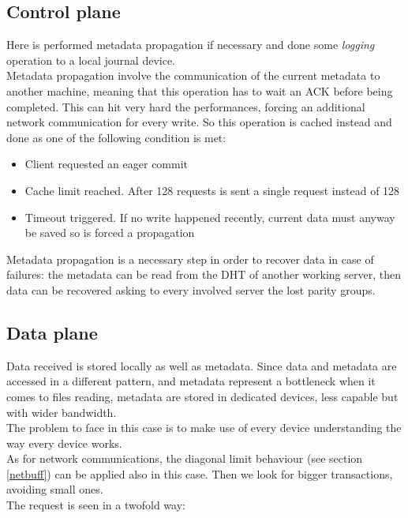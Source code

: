 \subsection{Control plane}
Here is performed metadata propagation if necessary and done some
\textit{logging} operation to a local journal device. \\ Metadata propagation
involve the communication of the current metadata to another machine, meaning
that this operation has to wait an ACK before being completed.  This can hit
very hard the performances, forcing an additional network communication for
every write. So this operation is cached instead and done as one of the
following condition is met:
\begin{itemize}
    \item Client requested an eager commit
    \item Cache limit reached. After 128 requests is sent a single request
        instead of 128
    \item Timeout triggered. If no write happened recently, current
        data must anyway be saved so is forced a propagation
\end{itemize}
Metadata propagation is a necessary step in order to recover data in case of
failures: the metadata can be read from the DHT of another working server, then
data can be recovered asking to every involved server the lost parity groups.

\subsection{Data plane}
Data received is stored locally as well as metadata. Since data and metadata
are accessed in a different pattern, and metadata represent a bottleneck when
it comes to files reading, metadata are stored in dedicated devices, less
capable but with wider bandwidth. \\
The problem to face in this case is to make use of every device understanding
the way every device works. \\
As for network communications, the diagonal limit behaviour (see section
\ref{netbuff}) can be applied also in this case. Then we look for bigger
transactions, avoiding small ones. \\
The request is seen in a twofold way: \\

